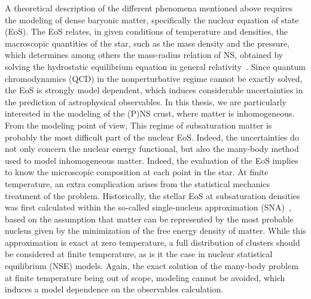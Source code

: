 A theoretical description of the different phenomena mentioned above requires 
the modeling of dense baryonic matter, specifically the nuclear equation of 
state (EoS). 
%
The EoS relates, in given conditions of temperature and 
densities, the macroscopic quantities of the star, such as the mass density and 
the pressure, which determines among others the mass-radius relation of NS, 
obtained by solving the hydrostatic equilibrium equation in general
relativity~\cite{Tolman1939,Oppenheimer1939}.
%
Since quantum chromodynamics (QCD) in the nonperturbative regime cannot be 
exactly solved, the EoS is strongly model dependent, which induces considerable 
uncertainties in the prediction of astrophysical observables. 
In this thesis, we are particularly interested in the modeling of the (P)NS 
crust, where matter is inhomogeneous. From the modeling point of view, This 
regime of subsaturation matter is probably the most difficult part of the 
nuclear EoS. Indeed, the uncertainties do not only concern the nuclear energy 
functional, but also the many-body method used to model inhomogeneous matter. 
%
Indeed, the evaluation of the EoS implies to know the microscopic composition 
at each point in the star. At finite temperature, an extra complication arises
from the statistical mechanics treatment of the problem. 
Historically, the stellar EoS at subsaturation 
densities was first calculated within the so-called single-nucleus 
approximation (SNA)~\cite{BBP,Negele1973}, based on the assumption that matter 
can be represented by the most probable nucleus given by the minimization of 
the free energy density of matter. While this approximation is exact at zero
temperature, a full distribution of clusters should be considered at finite
temperature, as is it the case in nuclear statistical equilibrium (NSE) models. 
Again, the exact solution of the many-body problem at finite temperature being 
out of scope, modeling cannot be avoided, which induces a model dependence on 
the observables calculation. 

